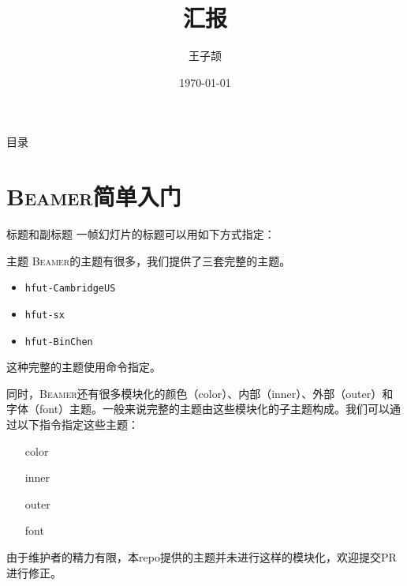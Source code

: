 \documentclass[aspectratio=169]{beamer}
\title{汇报}
\author{王子颉}
\institute{School of Computer and Informatics, HFUT}
\date{\today}
\newcommand{\Beamer}{\textsc{Beamer}}
\newcommand{\enableindent}{\setlength{\parskip}{6pt}\setlength{\parindent}{2em}}
\begin{document}
\begin{frame}
	\maketitle
\end{frame}

\begin{frame}{目录}
	\tableofcontents
\end{frame}

\section{\Beamer{}简单入门}

\begin{frame}[fragile]{标题}{和副标题}
一帧幻灯片的标题可以用如下方式指定：

\end{frame}


\begin{frame}{主题}
	\enableindent
	\Beamer 的主题有很多，我们提供了三套完整的主题。
	\begin{itemize}
		\item \texttt{hfut-CambridgeUS}
		\item \texttt{hfut-sx}
		\item \texttt{hfut-BinChen}
	\end{itemize}

	这种完整的主题使用\texttt{\usetheme}命令指定。

	\framebreak

	同时，\Beamer 还有很多模块化的颜色（color）、内部（inner）、外部（outer）和字体（font）主题。一般来说完整的主题由这些模块化的子主题构成。我们可以通过以下指令指定这些主题：
	\begin{itemize}
		\item[color] \texttt{\usecolortheme}
		\item[inner] \texttt{\useinnertheme}
		\item[outer] \texttt{\useoutertheme}
		\item[font] \texttt{\usefonttheme}
	\end{itemize}

	由于维护者的精力有限，本repo提供的主题并未进行这样的模块化，欢迎提交PR进行修正。

\end{frame}
\end{document}
